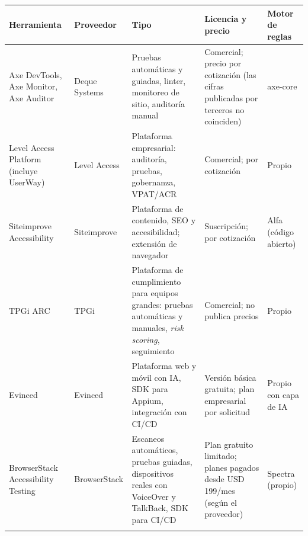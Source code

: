 \documentclass[10pt,letterpaper,onecolumn]{IEEEtran}
\newcommand{\filafina}{\arrayrulecolor{black!30}\specialrule{0.3pt}{1.5pt}{1.5pt}\arrayrulecolor{black}}
\begin{document}
\begin{longtable}[]{@{}
  >{\raggedright\arraybackslash}p{0.1867\dimexpr\linewidth-8\tabcolsep\relax}
  >{\raggedright\arraybackslash}p{0.2000\dimexpr\linewidth-8\tabcolsep\relax}
  >{\raggedright\arraybackslash}p{0.2933\dimexpr\linewidth-8\tabcolsep\relax}
  >{\raggedright\arraybackslash}p{0.1867\dimexpr\linewidth-8\tabcolsep\relax}
  >{\raggedright\arraybackslash}p{0.1333\dimexpr\linewidth-8\tabcolsep\relax}@{}}
\toprule\noalign{}
\begin{minipage}[b]{\linewidth}\raggedright
Herramienta
\end{minipage} & \begin{minipage}[b]{\linewidth}\raggedright
Proveedor
\end{minipage} & \begin{minipage}[b]{\linewidth}\raggedright
Tipo
\end{minipage} & \begin{minipage}[b]{\linewidth}\raggedright
Licencia y precio
\end{minipage} & \begin{minipage}[b]{\linewidth}\raggedright
Motor de reglas
\end{minipage} \\
\midrule\noalign{}
\endhead
\bottomrule\noalign{}
\endlastfoot
Axe DevTools, Axe Monitor, Axe Auditor & Deque Systems & Pruebas automáticas y guiadas, linter, monitoreo de sitio, auditoría manual & Comercial; precio por cotización (las cifras publicadas por terceros no coinciden) & axe-core \\ \filafina
Level Access Platform (incluye UserWay) & Level Access & Plataforma empresarial: auditoría, pruebas, gobernanza, VPAT/ACR & Comercial; por cotización & Propio \\ \filafina
Siteimprove Accessibility & Siteimprove & Plataforma de contenido, SEO y accesibilidad; extensión de navegador & Suscripción; por cotización & Alfa (código abierto) \\ \filafina
TPGi ARC & TPGi & Plataforma de cumplimiento para equipos grandes: pruebas automáticas y manuales, \emph{risk scoring}, seguimiento & Comercial; no publica precios & Propio \\ \filafina
Evinced & Evinced & Plataforma web y móvil con IA, SDK para Appium, integración con CI/CD & Versión básica gratuita; plan empresarial por solicitud & Propio con capa de IA \\ \filafina
BrowserStack Accessibility Testing & BrowserStack & Escaneos automáticos, pruebas guiadas, dispositivos reales con VoiceOver y TalkBack, SDK para CI/CD & Plan gratuito limitado; planes pagados desde USD 199/mes (según el proveedor) & Spectra (propio) \\ \filafina

\end{longtable}
\end{document}
